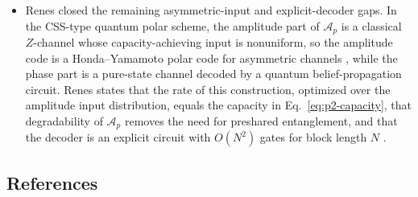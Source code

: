 \begin{itemize}
  \item Renes closed the remaining asymmetric-input and explicit-decoder
  gaps.  In the CSS-type quantum polar scheme, the amplitude part of
  $\mathcal A_p$ is a classical $Z$-channel whose capacity-achieving input
  is nonuniform, so the amplitude code is a Honda--Yamamoto polar code for
  asymmetric channels , while the
  phase part is a pure-state channel decoded by a quantum belief-propagation
  circuit.  Renes states that the rate of this construction, optimized over
  the amplitude input distribution, equals the capacity in
  Eq.~\eqref{eq:p2-capacity}, that degradability of $\mathcal A_p$ removes
  the need for preshared entanglement, and that the decoder is an explicit
  circuit with $O(N^2)$ gates for block length $N$
  .
\end{itemize}

\subsection*{References}

